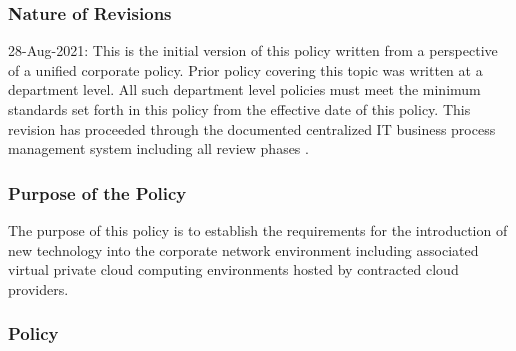 \documentclass[stu]{apa7}
\begin{document}
\subsubsection{Nature of Revisions}
\label{sec:org26be483}

28-Aug-2021: This is the initial version of this policy written from a perspective of a unified corporate policy. Prior policy covering this topic was written at a department level. All such department level policies must meet the minimum standards set forth in this policy from the effective date of this policy. This revision has proceeded through the documented centralized IT business process management system including all review phases \cite{wagleDevelopmentEffectiveCentralized2021}.

\subsubsection{Purpose of the Policy}
\label{sec:org39f2d93}

The purpose of this policy is to establish the requirements for the introduction of new technology into the corporate network environment including associated virtual private cloud computing environments hosted by contracted cloud providers.

\subsubsection{Policy}
\label{sec:org6c6bf83}
\end{document}
